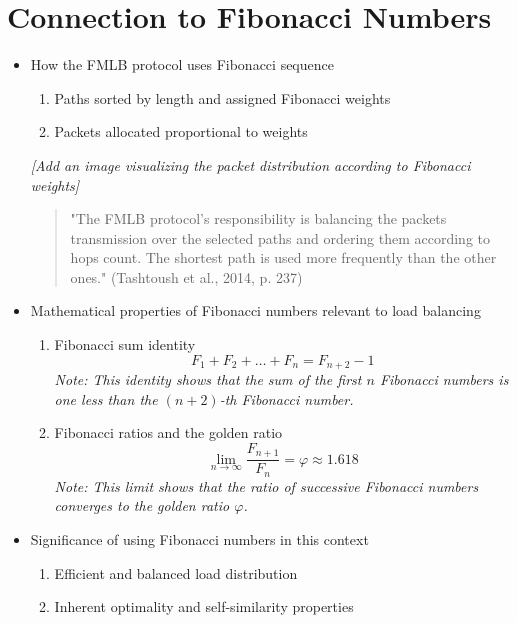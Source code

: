 \documentclass{article}
\begin{document}
\section{Connection to Fibonacci Numbers}
\begin{itemize}
    \item How the FMLB protocol uses Fibonacci sequence
    \begin{enumerate}
        \item Paths sorted by length and assigned Fibonacci weights
        \item Packets allocated proportional to weights
    \end{enumerate}
    \textit{[Add an image visualizing the packet distribution according to Fibonacci weights]}
    \begin{quote}
        "The FMLB protocol's responsibility is balancing the packets transmission over the selected paths and ordering them according to hops count. The shortest path is used more frequently than the other ones." (Tashtoush et al., 2014, p. 237)
    \end{quote}
    \item Mathematical properties of Fibonacci numbers relevant to load balancing
    \begin{enumerate}
        \item Fibonacci sum identity
        \begin{equation*}
            F_1 + F_2 + \dots + F_n = F_{n+2} - 1
        \end{equation*}
        \textit{Note: This identity shows that the sum of the first $n$ Fibonacci numbers is one less than the $(n+2)$-th Fibonacci number.}
        \item Fibonacci ratios and the golden ratio
        \begin{equation*}
            \lim_{n \to \infty} \frac{F_{n+1}}{F_n} = \varphi \approx 1.618
        \end{equation*}
        \textit{Note: This limit shows that the ratio of successive Fibonacci numbers converges to the golden ratio $\varphi$.}
    \end{enumerate}
    \item Significance of using Fibonacci numbers in this context
    \begin{enumerate}
        \item Efficient and balanced load distribution
        \item Inherent optimality and self-similarity properties
    \end{enumerate}

\end{itemize}
\end{document}
